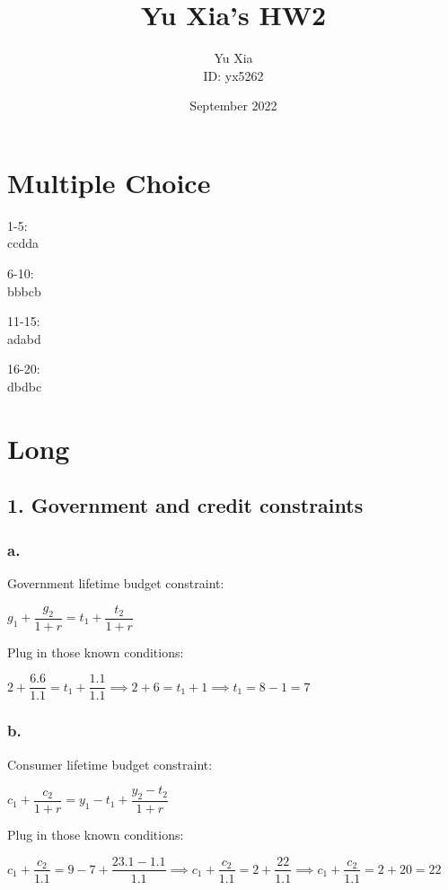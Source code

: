 \documentclass{article}
\author{Yu Xia \\ ID: yx5262}
\title{\textbf{Yu Xia's HW2}}
\date{September 2022}
\begin{document}
\maketitle

\nocite{*}

\section*{\textrm{Multiple Choice}}

1-5:\\
ccdda

6-10:\\
bbbcb

11-15:\\
adabd

16-20:\\
dbdbc

\section*{\textrm{Long}}

\subsection*{\textrm{1. Government and credit constraints}}

\subsubsection*{\textrm{a.}}

Government lifetime budget constraint:

$g_{1}+\dfrac{g_{2}}{1+r}=t_{1}+\dfrac{t_{2}}{1+r}$

Plug in those known conditions:

$2+\dfrac{6.6}{1.1}=t_{1}+\dfrac{1.1}{1.1}\implies2+6=t_{1}+1\implies \boxed{t_{1}=8-1=7}$

\subsubsection*{\textrm{b.}}

Consumer lifetime budget constraint:

$c_{1}+\dfrac{c_{2}}{1+r}=y_{1}-t_{1}+\dfrac{y_{2}-t_{2}}{1+r}$

Plug in those known conditions:

$c_{1}+\dfrac{c_{2}}{1.1}=9-7+\dfrac{23.1-1.1}{1.1}\implies c_{1}+\dfrac{c_{2}}{1.1}=2+\dfrac{22}{1.1}\implies c_{1}+\dfrac{c_{2}}{1.1}=2+20=22$
\end{document}
